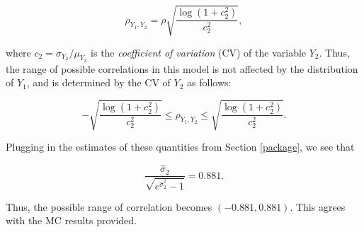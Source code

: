 \documentclass[
]{jss}
\begin{document}
\begin{equation}
\label{eq:kram9}
\rho_{Y_1, Y_2} = \rho \sqrt{\frac{\log(1+c_2^2)}{c_2^2}},
\end{equation}

where \(c_2=\sigma_{Y_2}/\mu_{Y_2}\) is the \emph{coefficient of variation} (CV) of the variable \(Y_2\). Thus, the range of possible correlations in this model is not affected by the distribution of \(Y_1\), and is determined by the CV of \(Y_2\) as follows:

\begin{equation}
\label{eq:kram10}
- \sqrt{\frac{\log(1+c_2^2)}{c_2^2}} \leq \rho_{Y_1, Y_2} \leq \sqrt{\frac{\log(1+c_2^2)}{c_2^2}}. 
\end{equation}

Plugging in the estimates of these quantities from Section \ref{package}, we see that

\begin{equation}
\label{eq:kram11}
\frac{\hat{\sigma}_2}{\sqrt{e^{\hat{\sigma}_2^2} -1}} = 0.881.
\end{equation}

Thus, the possible range of correlation becomes \((-0.881, 0.881)\). This agrees with the MC results provided.


\end{document}
